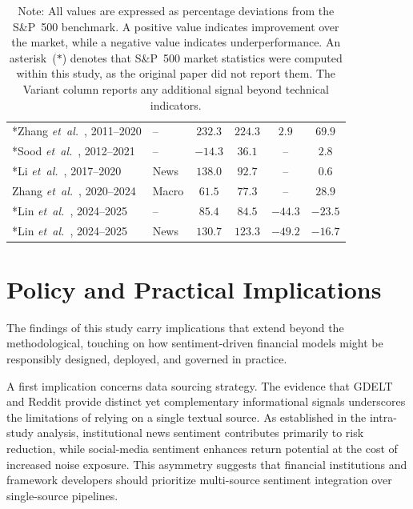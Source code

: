 \begin{table}[ht]
\begin{tabular}{|l | l | c | c | c | c|}
*Zhang \emph{et~al.}~\cite{984be}, 2011--2020     & --       & $232.3$ & $224.3$ & $2.9$   & $69.9$  \\
*Sood \emph{et~al.}~\cite{0df79}, 2012--2021      & --       & $-14.3$ & $36.1$  & --      & $2.8$   \\
*Li \emph{et~al.}~\cite{de270}, 2017--2020        & News     & $138.0$ & $92.7$  & --      & $0.6$   \\
Zhang \emph{et~al.}~\cite{4e332}, 2020--2024      & Macro    & $61.5$  & $77.3$  & --      & $28.9$  \\
*Lin \emph{et~al.}~\cite{e6ca3}, 2024--2025       & --       & $85.4$  & $84.5$  & $-44.3$ & $-23.5$ \\
*Lin \emph{et~al.}~\cite{e6ca3}, 2024--2025       & News     & $130.7$ & $123.3$ & $-49.2$ & $-16.7$ \\
\hline
\end{tabular}
\caption*{\footnotesize
Note: All values are expressed as percentage deviations from the S\&P~500 benchmark. A positive value indicates improvement over the market, while a negative value indicates underperformance. An asterisk~($*$) denotes that S\&P~500 market statistics were computed within this study, as the original paper did not report them. The Variant column reports any additional signal beyond technical indicators.
}
\end{table}


\section{Policy and Practical Implications}
\label{sec:policy_implications}
 
The findings of this study carry implications that extend beyond the methodological, touching on how sentiment-driven financial models might be responsibly designed, deployed, and governed in practice.
 
A first implication concerns data sourcing strategy. The evidence that GDELT and Reddit provide distinct yet complementary informational signals underscores the limitations of relying on a single textual source. As established in the intra-study analysis, institutional news sentiment contributes primarily to risk reduction, while social-media sentiment enhances return potential at the cost of increased noise exposure. This asymmetry suggests that financial institutions and framework developers should prioritize multi-source sentiment integration over single-source pipelines.
 
